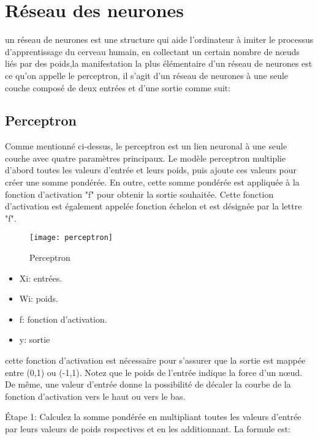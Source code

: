 \section{Réseau des neurones}
        un réseau de neurones est une structure qui aide l'ordinateur à imiter le processus d'apprentissage du cerveau humain, en collectant un certain nombre de nœuds liés par des poids,la manifestation la plus élémentaire d'un réseau de neurones est ce qu'on appelle le perceptron, il s'agit d'un réseau de neurones à une seule couche composé de deux entrées et d'une sortie comme suit:

        \subsection{Perceptron}
            Comme mentionné ci-dessus, le perceptron est  un lien neuronal à une seule couche avec quatre paramètres principaux. Le modèle perceptron multiplie d'abord toutes les valeurs d'entrée et leurs poids, puis ajoute ces valeurs pour créer une somme pondérée. En outre, cette somme pondérée est appliquée à la fonction d'activation "f" pour obtenir la sortie souhaitée. Cette fonction d'activation est également appelée fonction échelon et est désignée par la lettre "f".
            \begin{figure}[H]
                \centering
                \texttt{[image: perceptron]}
                \caption{Perceptron}
                \label{fig:perceptron}
            \end{figure}

            \begin{itemize}[label=$\bullet$]
                \item Xi: entrées.
                \item Wi: poids.
                \item f: fonction d'activation.
                \item y: sortie 
            \end{itemize}

            cette fonction d'activation est nécessaire pour s'assurer que la sortie est  mappée entre (0,1) ou (-1,1). Notez que le poids de l'entrée indique la force d'un nœud. De même, une valeur d'entrée donne la possibilité de décaler la courbe de la fonction d'activation vers le haut ou vers le bas.
            
            Étape 1: Calculez la somme pondérée en multipliant toutes les valeurs d'entrée par leurs valeurs de poids respectives et en les additionnant. La formule est:

